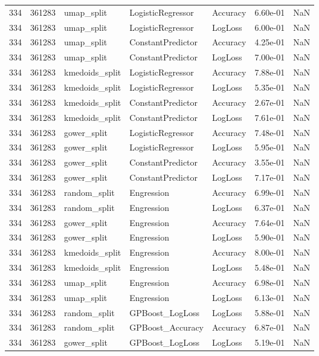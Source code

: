 \begin{tabular}{rrlllrr}
334 & 361283 & umap\_split & LogisticRegressor & Accuracy & 6.60e-01 & NaN \\
334 & 361283 & umap\_split & LogisticRegressor & LogLoss & 6.00e-01 & NaN \\
334 & 361283 & umap\_split & ConstantPredictor & Accuracy & 4.25e-01 & NaN \\
334 & 361283 & umap\_split & ConstantPredictor & LogLoss & 7.00e-01 & NaN \\
334 & 361283 & kmedoids\_split & LogisticRegressor & Accuracy & 7.88e-01 & NaN \\
334 & 361283 & kmedoids\_split & LogisticRegressor & LogLoss & 5.35e-01 & NaN \\
334 & 361283 & kmedoids\_split & ConstantPredictor & Accuracy & 2.67e-01 & NaN \\
334 & 361283 & kmedoids\_split & ConstantPredictor & LogLoss & 7.61e-01 & NaN \\
334 & 361283 & gower\_split & LogisticRegressor & Accuracy & 7.48e-01 & NaN \\
334 & 361283 & gower\_split & LogisticRegressor & LogLoss & 5.95e-01 & NaN \\
334 & 361283 & gower\_split & ConstantPredictor & Accuracy & 3.55e-01 & NaN \\
334 & 361283 & gower\_split & ConstantPredictor & LogLoss & 7.17e-01 & NaN \\
334 & 361283 & random\_split & Engression & Accuracy & 6.99e-01 & NaN \\
334 & 361283 & random\_split & Engression & LogLoss & 6.37e-01 & NaN \\
334 & 361283 & gower\_split & Engression & Accuracy & 7.64e-01 & NaN \\
334 & 361283 & gower\_split & Engression & LogLoss & 5.90e-01 & NaN \\
334 & 361283 & kmedoids\_split & Engression & Accuracy & 8.00e-01 & NaN \\
334 & 361283 & kmedoids\_split & Engression & LogLoss & 5.48e-01 & NaN \\
334 & 361283 & umap\_split & Engression & Accuracy & 6.98e-01 & NaN \\
334 & 361283 & umap\_split & Engression & LogLoss & 6.13e-01 & NaN \\
334 & 361283 & random\_split & GPBoost\_LogLoss & LogLoss & 5.88e-01 & NaN \\
334 & 361283 & random\_split & GPBoost\_Accuracy & Accuracy & 6.87e-01 & NaN \\
334 & 361283 & gower\_split & GPBoost\_LogLoss & LogLoss & 5.19e-01 & NaN \\

\end{tabular}
